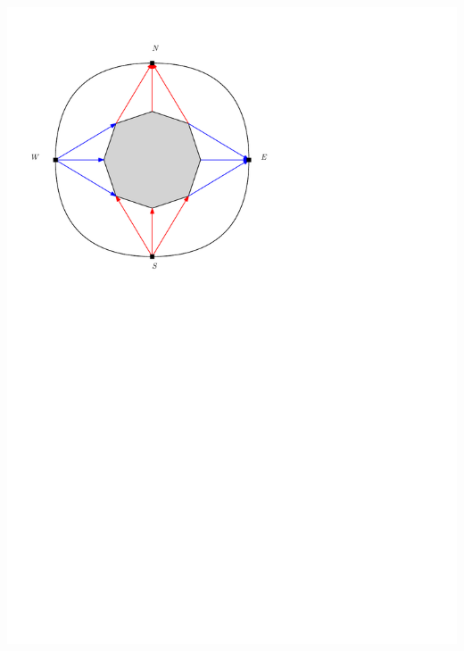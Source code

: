 \documentclass[a4paper]{article}
\begin{document}
\includegraphics[width =\textwidth]{./rectangularDuals/img/exteriorCondition.pdf}
\clearpage%
\end{document}
